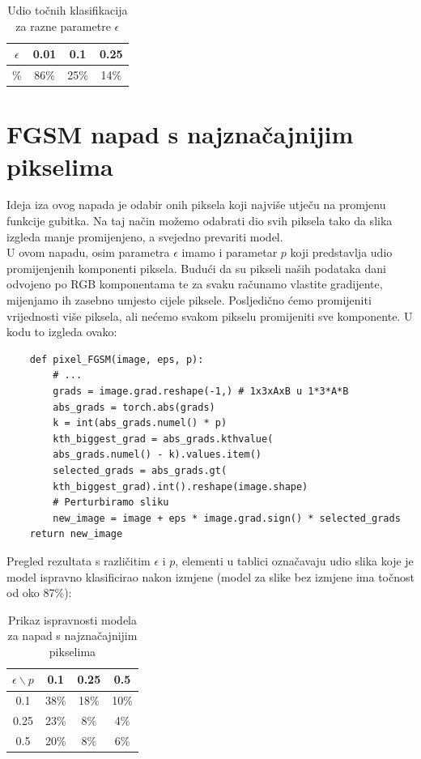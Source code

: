 \begin{table}[H]
	\centering
	\begin{tabular}{||c || c | c | c||} 
		\hline
		$\epsilon$ & 0.01 & 0.1 & 0.25 \\ [0.5ex] 
		\hline\hline
		\% & 86\% & 25\% & 14\% \\ 
		\hline
	\end{tabular}
	\caption{Udio točnih klasifikacija za razne parametre $\epsilon$}
\end{table}


\section{FGSM napad s najznačajnijim pikselima}

Ideja iza ovog napada je odabir onih piksela koji najviše utječu na promjenu funkcije gubitka. Na taj način možemo odabrati dio svih piksela tako da slika izgleda manje promijenjeno, a svejedno prevariti model. \\
U ovom napadu, osim parametra $\epsilon$ imamo i parametar $p$ koji predstavlja udio promijenjenih komponenti piksela. Budući da su pikseli naših podataka dani odvojeno po RGB komponentama te za svaku računamo vlastite gradijente, mijenjamo ih zasebno umjesto cijele piksele. Posljedično ćemo promijeniti vrijednosti više piksela, ali nećemo svakom pikselu promijeniti sve komponente. U kodu to izgleda ovako:
\begin{verbatim}
    def pixel_FGSM(image, eps, p):
        # ...
        grads = image.grad.reshape(-1,) # 1x3xAxB u 1*3*A*B
        abs_grads = torch.abs(grads)
        k = int(abs_grads.numel() * p)
        kth_biggest_grad = abs_grads.kthvalue(
        abs_grads.numel() - k).values.item()
        selected_grads = abs_grads.gt(
        kth_biggest_grad).int().reshape(image.shape)
        # Perturbiramo sliku
        new_image = image + eps * image.grad.sign() * selected_grads
    return new_image
\end{verbatim}

Pregled rezultata s različitim $\epsilon$ i $p$, elementi u tablici označavaju udio slika koje je model ispravno klasificirao nakon izmjene (model za slike bez izmjene ima točnost od oko 87\%):

\begin{table}[H]
	\centering
	\begin{tabular}{||c || c c c||} 
		\hline
		$\epsilon \backslash p$ & 0.1 & 0.25 & 0.5 \\ [0.5ex] 
		\hline\hline
		0.1 & 38\% & 18\% & 10\% \\ 
		0.25 & 23\% & 8\% & 4\% \\
		0.5 & 20\% & 8\% & 6\% \\ [1ex] 
		\hline
	\end{tabular}
	\caption{Prikaz ispravnosti modela za napad s najznačajnijim pikselima}
\end{table}

